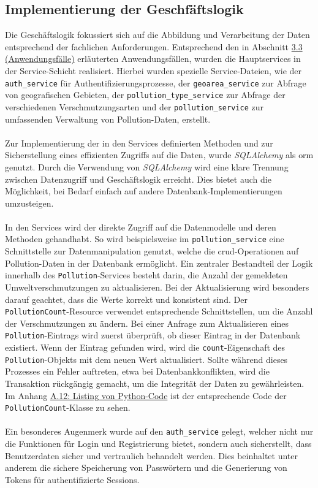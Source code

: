 \documentclass[a4paper,12pt]{article}
\begin{document}
\subsection{Implementierung der Geschfäftslogik}
Die Geschäftslogik fokussiert sich auf die Abbildung und Verarbeitung der Daten entsprechend der fachlichen Anforderungen. Entsprechend den in Abschnitt \hyperref[sec:anwendungsfälle]{3.3 (Anwendungsfälle)} erläuterten Anwendungsfällen, wurden die Hauptservices in der Service-Schicht realisiert. Hierbei wurden spezielle Service-Dateien, wie der \texttt{auth\_service} für Authentifizierungsprozesse, der \texttt{geoarea\_service} zur Abfrage von geografischen Gebieten, der \texttt{pollution\_type\_service} zur Abfrage der verschiedenen Verschmutzungsarten und der \texttt{pollution\_service} zur umfassenden Verwaltung von Pollution-Daten, erstellt.\\
\\
Zur Implementierung der in den Services definierten Methoden und zur Sicherstellung eines effizienten Zugriffs auf die Daten, wurde \textit{SQLAlchemy} als \acrshort{orm} genutzt. Durch die Verwendung von \textit{SQLAlchemy} wird eine klare Trennung zwischen Datenzugriff und Geschäftslogik erreicht. Dies bietet auch die Möglichkeit, bei Bedarf einfach auf andere Datenbank-Implementierungen umzusteigen.\\
\\
In den Services wird der direkte Zugriff auf die Datenmodelle und deren Methoden gehandhabt. So wird beispielsweise im \texttt{pollution\_service} eine Schnittstelle zur Datenmanipulation genutzt, welche die \acrshort{crud}-Operationen auf Pollution-Daten in der Datenbank ermöglicht. Ein zentraler Bestandteil der Logik innerhalb des \texttt{Pollution}-Services besteht darin, die Anzahl der gemeldeten Umweltverschmutzungen zu aktualisieren. Bei der Aktualisierung wird besonders darauf geachtet, dass die Werte korrekt und konsistent sind. Der \texttt{PollutionCount}-Resource verwendet entsprechende Schnittstellen, um die Anzahl der Verschmutzungen zu ändern. Bei einer Anfrage zum Aktualisieren eines \texttt{Pollution}-Eintrags wird zuerst überprüft, ob dieser Eintrag in der Datenbank existiert. Wenn der Eintrag gefunden wird, wird die \texttt{count}-Eigenschaft des \texttt{Pollution}-Objekts mit dem neuen Wert aktualisiert. Sollte während dieses Prozesses ein Fehler auftreten, etwa bei Datenbankkonflikten, wird die Transaktion rückgängig gemacht, um die Integrität der Daten zu gewährleisten. Im Anhang \hyperref[sec:python-code]{A.12: Listing von Python-Code} ist der entsprechende Code der \texttt{PollutionCount}-Klasse zu sehen.\\
\\
Ein besonderes Augenmerk wurde auf den \texttt{auth\_service} gelegt, welcher nicht nur die Funktionen für Login und Registrierung bietet, sondern auch sicherstellt, dass Benutzerdaten sicher und vertraulich behandelt werden. Dies beinhaltet unter anderem die sichere Speicherung von Passwörtern und die Generierung von Tokens für authentifizierte Sessions.
\end{document}
